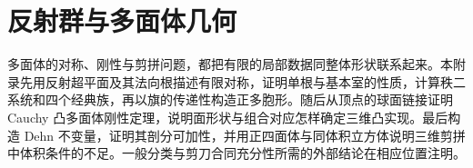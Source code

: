 
% 
% 
% 
% 
% 
% 
% 
% 

\chapter{反射群与多面体几何}
\label{g1:app:E}

\begin{chapterabstract}
	多面体的对称、刚性与剪拼问题，都把有限的局部数据同整体形状联系起来。本附录先用反射超平面及其法向根描述有限对称，证明单根与基本室的性质，计算秩二系统和四个经典族，再以旗的传递性构造正多胞形。随后从顶点的球面链接证明 Cauchy 凸多面体刚性定理，说明面形状与组合对应怎样确定三维凸实现。最后构造 Dehn 不变量，证明其剖分可加性，并用正四面体与同体积立方体说明三维剪拼中体积条件的不足。一般分类与剪刀合同充分性所需的外部结论在相应位置注明。
\end{chapterabstract}

